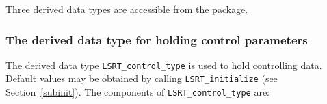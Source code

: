 \documentclass{galahad}
\newcommand{\packagename}{LS\-RT}
\begin{document}




\galtypes
Three derived data types are accessible from the package.


\subsubsection{The derived data type for holding control
 parameters}\label{typecontrol}
The derived data type
{\tt \packagename\_control\_type}
is used to hold controlling data. Default values may be obtained by calling
{\tt \packagename\_initialize}
(see Section~\ref{subinit}). The components of
{\tt \packagename\_control\_type}
are:
\end{document}
